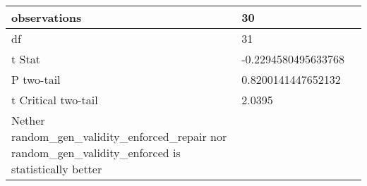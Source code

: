 \documentclass[11pt]{article}
\begin{document}
\begin{table}[H]
{\begin{tabular}{|l|l|l|}
    observations                                                                                              & 30                              &                                        \\ \hline
    df                                                                                                        & 31                              &                                        \\ \hline
    t Stat                                                                                                    & -0.2294580495633768             &                                        \\ \hline
    P two-tail                                                                                                & 0.8200141447652132              &                                        \\ \hline
    t Critical two-tail                                                                                       & 2.0395                          &                                        \\ \hline
    Nether random\_gen\_validity\_enforced\_repair nor random\_gen\_validity\_enforced is statistically better &                                 &                                        \\ \hline
    \end{tabular}%
    }
\end{table}
\end{document}
